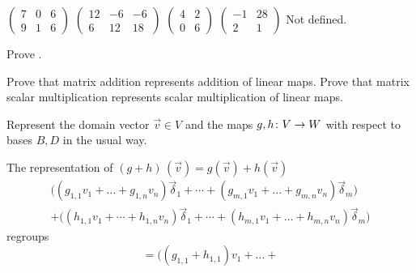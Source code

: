 \begin{exercises}
\begin{answer}
\begin{exparts*}
        \partsitem \( \begin{pmatrix}
                   7  &0  &6  \\
                   9  &1  &6
                 \end{pmatrix}  \)
        \partsitem \( \begin{pmatrix}
                  12  &-6 &-6 \\
                   6  &12 &18
                 \end{pmatrix}  \)
        \partsitem \( \begin{pmatrix}
                   4  &2  \\
                   0  &6
                 \end{pmatrix}  \)
        \partsitem \( \begin{pmatrix}
                  -1  &28 \\
                   2  &1
                 \end{pmatrix}  \)
        \partsitem Not defined.
      \end{exparts*}  
   \end{answer}
  \item \label{exer:CorrspMapMatOps}
    Prove .
    \begin{exparts}
      \partsitem Prove that matrix addition represents addition of linear maps.
      \partsitem Prove that matrix scalar multiplication represents scalar
         multiplication of linear maps.
    \end{exparts}
    \begin{answer}
      Represent the domain vector $\vec{v}\in V$ and the maps
      $\mbox{$g,h\colon V\to W$}$ with respect to bases $B,D$ in the usual way.
      \begin{exparts}
      \partsitem The representation of
         $(g+h)\,(\vec{v})=g(\vec{v})+h(\vec{v})$
        \begin{multline*}
          \bigl( (g_{1,1}v_1+\dots+g_{1,n}v_n)\vec{\delta}_1  
                  +\cdots                     
                  +(g_{m,1}v_1+\dots+g_{m,n}v_n)\vec{\delta}_m \bigr) \\ 
           +\bigl( (h_{1,1}v_1+\cdots+h_{1,n}v_n)\vec{\delta}_1    
                   +\cdots                                  
                   +(h_{m,1}v_1+\dots+h_{m,n}v_n)\vec{\delta}_m \bigr) 
         \end{multline*}
         regroups
         \begin{equation*}
          =((g_{1,1}+h_{1,1})v_1+\dots+

\end{equation*}
\end{exparts}
\end{answer}
\end{exercises}
